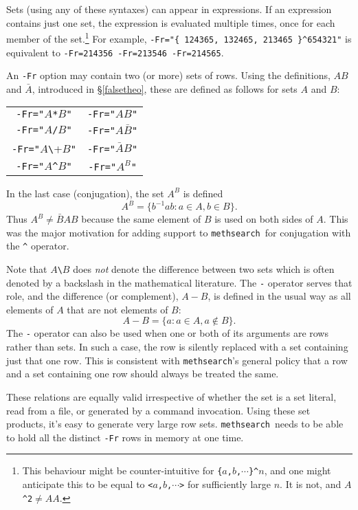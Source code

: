 \documentclass[a4paper,11pt,oneside]{book}
\def\methsearch{\texttt{meth\-search}}
\newcommand{\sref}[1]{\hyperref[#1]{\S\ref{#1}}}
\begin{document}
Sets (using any of these syntaxes) can appear in expressions.  If an
expression contains just one set, the expression is evaluated multiple
times, once for each member of the set.\footnote{This behaviour might be
counter-intuitive for \verb+{+$a$\verb+,+$b$\verb+,+$\cdots$\verb+}^+$n$,
and one might anticipate this to be equal to 
\verb+<+$a$\verb+,+$b$\verb+,+$\cdots$\verb+>+ for sufficiently large $n$.
It is not, and $A$\verb+^2+${} \not= AA$.}
For example, \verb+-Fr="{ 124365, 132465, 213465 }^654321"+
is equivalent to \verb+-Fr=214356 -Fr=213546 -Fr=214565+.

An \verb+-Fr+ option may contain two (or more) sets of rows.  Using
the definitions, $AB$ and $\bar{A}$, introduced in \sref{falsetheo}, 
these are defined as follows for sets $A$ and $B$:

\begin{tabular}{c@{$\quad\iff\quad$}c}
\verb+-Fr="+$A$\verb+*+$B$\verb+"+  &  \verb+-Fr="+$A B$\verb+"+ \\
\verb+-Fr="+$A$\verb+/+$B$\verb+"+  &  \verb+-Fr="+$A \bar{B}$\verb+"+ \\
\verb+-Fr="+$A$\verb+\+$B$\verb+"+  &  \verb+-Fr="+$\bar{A} B$\verb+"+ \\
\verb+-Fr="+$A$\verb+^+$B$\verb+"+  &  \verb+-Fr="+$A^B$\verb+"+ \\
\end{tabular}

In the last case (conjugation), the set $A^B$ is defined
\[ A^B = \{ b^{-1} a b : a \in A, b \in B \}. \]
Thus $A^B \not= \bar{B}AB$ because the same element of $B$ is used on both
sides of $A$.  This was the major motivation for adding support to 
\methsearch\ for conjugation with the \verb+^+ operator.

Note that $A$\verb+\+$B$ does \textit{not} denote the difference
between two sets which is often denoted by a backslash in the mathematical
literature.   The \verb+-+ operator serves that role,
and the difference (or complement), $A-B$, is defined in the usual way as
all elements of $A$ that are not elements of $B$:
\[ A-B = \{ a : a \in A, a \not\in B \}. \]
The \verb+-+ operator can also be used when one or both of its arguments 
are rows rather than sets.  In such a case, the row is silently replaced 
with a set containing just that one row.  
This is consistent with \methsearch's general policy that a row
and a set containing one row should always be treated the same.

These relations are equally valid irrespective of whether the set is a 
set literal, read from a file, or generated by a command invocation.
Using these set products, it's easy to generate very large row sets.  
\methsearch\ needs to be able to hold all the distinct \verb+-Fr+ rows 
in memory at one time.
\end{document}
